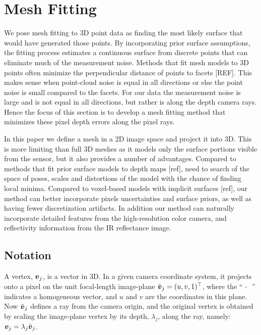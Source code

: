 \section{Mesh Fitting}
\label{sec:fitting}

We pose mesh fitting to 3D point data as finding the most likely surface that would have generated those points.  By incorporating prior surface assumptions, the fitting process estimates a continuous surface from discrete points that can eliminate much of the measurement noise.  Methods that fit mesh models to 3D points often minimize the perpendicular distance of points to facets [REF].  This makes sense when point-cloud noise is equal in all directions or else the point noise is small compared to the facets.  For our data the measurement noise is large and is not equal in all directions, but rather is along the depth camera rays.  Hence the focus of this section is to develop a mesh fitting method that minimizes these pixel depth errors along the pixel rays.

In this paper we define a mesh in a $2$D image space and project it into $3$D.  This is more limiting than full $3$D meshes as it models only the surface portions visible from the sensor, but it also provides a number of advantages.  Compared to methods that fit prior surface models to depth maps [ref], need to search of the space of poses, scales and distortions of the model with the chance of finding local minima.  Compared to voxel-based models with implicit surfaces [ref], our method can better incorporate pixels uncertainties and surface priors, as well as having fewer discretization artifacts.  In addition our method can naturally incorporate detailed features from the high-resolution color camera, and reflectivity information from the IR reflectance image.

\subsection{Notation}

A vertex, $\boldsymbol{v}_j$, is a vector in $3$D.  In a given camera coordinate system, it projects onto a pixel on the unit focal-length image-plane $\tilde{\boldsymbol{v}}_j=(u,v,1)^\top$, where the `` $\tilde{\text{ }}$ '' indicates a homogeneous vector, and $u$ and $v$ are the coordinates in this plane.  Now $\tilde{\boldsymbol{v}}_j$ defines a ray from the camera origin, and the original vertex is obtained by scaling the image-plane vertex by its depth, $\lambda_j$, along the ray, namely: $\boldsymbol{v}_j = \lambda_j\tilde{\boldsymbol{v}}_j$. 

